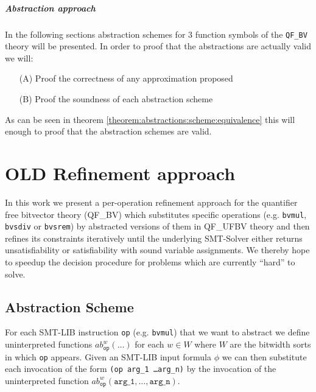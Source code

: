 \paragraph{Abstraction approach}
In the following sections abstraction schemes for 3 function symbols of the \texttt{QF\_BV} theory will be presented. In order to proof that the abstractions are actually valid we will:
\begin{itemize}
    \item[(A)] Proof the correctness of any approximation proposed
    \item[(B)] Proof the soundness of each abstraction scheme
\end{itemize}
As can be seen in theorem \ref{theorem:abstractions:scheme:equivalence} this will enough to proof that the abstraction schemes are valid.




































\chapter{OLD Refinement approach}
\label{ch:refinement_approach}
In this work we present a per-operation refinement approach for the quantifier free bitvector theory (QF\_BV) which substitutes specific operations (e.g. \texttt{bvmul}, \texttt{bvsdiv} or \texttt{bvsrem}) by abstracted versions of them in QF\_UFBV theory and then refines its constraints iteratively until the underlying SMT-Solver either returns unsatisfiability or satisfiability with sound variable assignments. We thereby hope to speedup the decision procedure for problems which are currently \enquote{hard} to solve.

\section{Abstraction Scheme}
\label{sec:refinement_approach:abstraction_scheme}
For each SMT-LIB instruction \texttt{op} (e.g. \texttt{bvmul}) that we want to abstract we define uninterpreted functions $ab_{\texttt{op}}^w\left(\dots\right)$ for each $w\in W$ where $W$ are the bitwidth sorts in which \texttt{op} appears.
Given an SMT-LIB input formula $\phi$ we can then substitute each invocation of the form \texttt{(op arg\_1 \dots arg\_n)} by the invocation of the uninterpreted function $ab_{\texttt{op}}^w\left(\texttt{arg\_1}, \dots, \texttt{arg\_n}\right)$.

